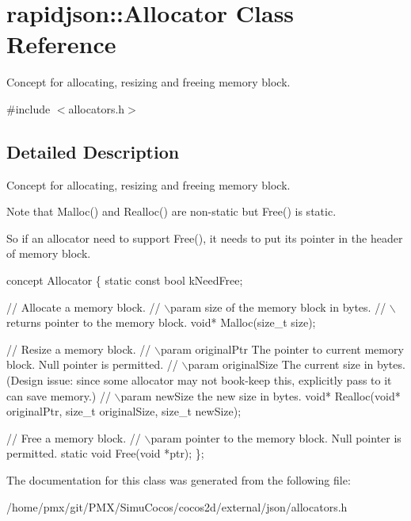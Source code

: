 \hypertarget{classrapidjson_1_1Allocator}{}\section{rapidjson\+:\+:Allocator Class Reference}
\label{classrapidjson_1_1Allocator}


Concept for allocating, resizing and freeing memory block.  




{\ttfamily \#include $<$allocators.\+h$>$}



\subsection{Detailed Description}
Concept for allocating, resizing and freeing memory block. 

Note that Malloc() and Realloc() are non-\/static but Free() is static.

So if an allocator need to support Free(), it needs to put its pointer in the header of memory block.


\begin{DoxyCode}
concept Allocator \{
    \textcolor{keyword}{static} \textcolor{keyword}{const} \textcolor{keywordtype}{bool} kNeedFree;    

    \textcolor{comment}{// Allocate a memory block.}
    \textcolor{comment}{// \(\backslash\)param size of the memory block in bytes.}
    \textcolor{comment}{// \(\backslash\)returns pointer to the memory block.}
    \textcolor{keywordtype}{void}* Malloc(\textcolor{keywordtype}{size\_t} size);

    \textcolor{comment}{// Resize a memory block.}
    \textcolor{comment}{// \(\backslash\)param originalPtr The pointer to current memory block. Null pointer is permitted.}
    \textcolor{comment}{// \(\backslash\)param originalSize The current size in bytes. (Design issue: since some allocator may not book-keep
       this, explicitly pass to it can save memory.)}
    \textcolor{comment}{// \(\backslash\)param newSize the new size in bytes.}
    \textcolor{keywordtype}{void}* Realloc(\textcolor{keywordtype}{void}* originalPtr, \textcolor{keywordtype}{size\_t} originalSize, \textcolor{keywordtype}{size\_t} newSize);

    \textcolor{comment}{// Free a memory block.}
    \textcolor{comment}{// \(\backslash\)param pointer to the memory block. Null pointer is permitted.}
    \textcolor{keyword}{static} \textcolor{keywordtype}{void} Free(\textcolor{keywordtype}{void} *ptr);
\};
\end{DoxyCode}
 

The documentation for this class was generated from the following file\+:\begin{DoxyCompactItemize}
\item 
/home/pmx/git/\+P\+M\+X/\+Simu\+Cocos/cocos2d/external/json/allocators.\+h\end{DoxyCompactItemize}
